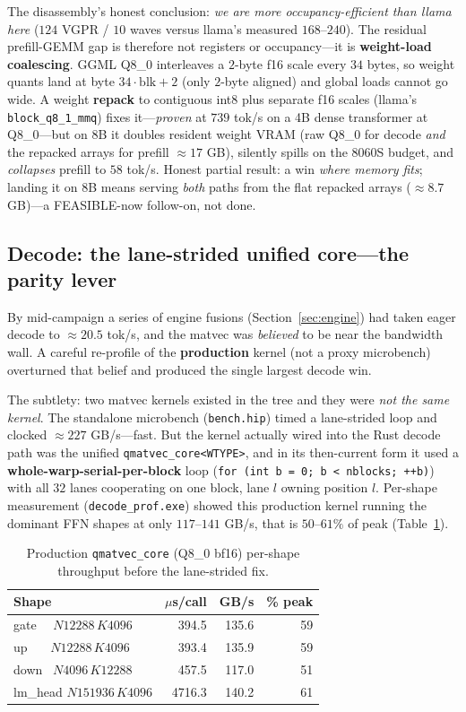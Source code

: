 \documentclass[11pt]{article}
\begin{document}
The disassembly's honest conclusion: \emph{we are more occupancy-efficient than llama here} ($124$ VGPR / $10$ waves versus llama's measured $168$--$240$). The residual prefill-GEMM gap is therefore not registers or occupancy---it is \textbf{weight-load coalescing}. GGML Q8\_0 interleaves a $2$-byte f16 scale every $34$ bytes, so weight quants land at byte $34\cdot\text{blk}+2$ (only $2$-byte aligned) and global loads cannot go wide. A weight \textbf{repack} to contiguous int8 plus separate f16 scales (llama's \texttt{block\_q8\_1\_mmq}) fixes it---\emph{proven} at $739$ tok/s on a 4B dense transformer at Q8\_0---but on 8B it doubles resident weight VRAM (raw Q8\_0 for decode \emph{and} the repacked arrays for prefill $\approx 17$ GB), silently spills on the 8060S budget, and \emph{collapses} prefill to $58$ tok/s. Honest partial result: a win \emph{where memory fits}; landing it on 8B means serving \emph{both} paths from the flat repacked arrays ($\approx 8.7$ GB)---a FEASIBLE-now follow-on, not done.

\subsection{Decode: the lane-strided unified core---the parity lever}
\label{sec:lanestride}

By mid-campaign a series of engine fusions (Section~\ref{sec:engine}) had taken eager decode to $\approx 20.5$ tok/s, and the matvec was \emph{believed} to be near the bandwidth wall. A careful re-profile of the \textbf{production} kernel (not a proxy microbench) overturned that belief and produced the single largest decode win.

The subtlety: two matvec kernels existed in the tree and they were \emph{not the same kernel}. The standalone microbench (\texttt{bench.hip}) timed a lane-strided loop and clocked $\approx 227$ GB/s---fast. But the kernel actually wired into the Rust decode path was the unified \texttt{qmatvec\_core<WTYPE>}, and in its then-current form it used a \textbf{whole-warp-serial-per-block} loop (\texttt{for (int b = 0; b < nblocks; ++b)}) with all $32$ lanes cooperating on one block, lane $l$ owning position $l$. Per-shape measurement (\texttt{decode\_prof.exe}) showed this production kernel running the dominant FFN shapes at only $117$--$141$ GB/s, that is $50$--$61\%$ of peak (Table~\ref{tab:prodmatvec}).

\begin{table}[t]
\centering
\caption{Production \texttt{qmatvec\_core} (Q8\_0 bf16) per-shape throughput before the lane-strided fix.}
\label{tab:prodmatvec}
\begin{tabular}{lrrr}
\toprule
\textbf{Shape} & \textbf{$\mu$s/call} & \textbf{GB/s} & \textbf{\% peak} \\
\midrule
gate \ \ $N12288\,K4096$  & 394.5 & 135.6 & 59 \\
up \ \ \ $N12288\,K4096$  & 393.4 & 135.9 & 59 \\
down \ $N4096\,K12288$    & 457.5 & 117.0 & 51 \\
lm\_head $N151936\,K4096$ & 4716.3 & 140.2 & 61 \\
\bottomrule
\end{tabular}
\end{table}
\end{document}
